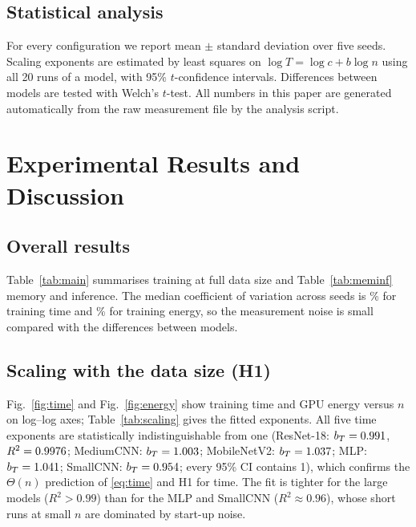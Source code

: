 \documentclass[conference]{IEEEtran}
\begin{document}
\subsection{Statistical analysis}
For every configuration we report mean $\pm$ standard deviation over five seeds. Scaling exponents are estimated by
least squares on $\log T = \log c + b\log n$ using all 20 runs of a model, with 95\% $t$-confidence intervals.
Differences between models are tested with Welch's $t$-test. All numbers in this paper are generated
automatically from the raw measurement file by the analysis script.

\section{Experimental Results and Discussion}
\subsection{Overall results}
Table~\ref{tab:main} summarises training at full data size and Table~\ref{tab:meminf} memory and inference.
The median coefficient of variation across seeds is \cvtime\% for training time and \cvenergy\% for training
energy, so the measurement noise is small compared with the differences between models.

\begin{table}[t]
\centering
\caption{Training at $n=50\,000$ (mean $\pm$ std over 5 seeds). $E^{GPU}$: NVML hardware counter; $E^{tot}$: CodeCarbon CPU+GPU+RAM}
\label{tab:main}

\end{table}

\begin{table}[t]
\centering
\caption{Memory and inference at $n=50\,000$ (mean $\pm$ std). VRAM$_{tr}$: model-attributable peak during training; $T_{inf}$, $E_{inf}$: one pass over the 10k test set on the GPU ($B=1000$)}
\label{tab:meminf}

\end{table}

\subsection{Scaling with the data size (H1)}
Fig.~\ref{fig:time} and Fig.~\ref{fig:energy} show training time and GPU energy versus $n$ on log--log axes;
Table~\ref{tab:scaling} gives the fitted exponents. All five time exponents are statistically indistinguishable from
one (ResNet-18: $b_T=0.991$, $R^2=0.9976$; MediumCNN: $b_T=1.003$; MobileNetV2: $b_T=1.037$; MLP:
$b_T=1.041$; SmallCNN: $b_T=0.954$; every 95\% CI contains 1), which confirms the $\Theta(n)$ prediction of
\eqref{eq:time} and H1 for time. The fit is tighter for the large models ($R^2>0.99$) than for the MLP and SmallCNN
($R^2\approx0.96$), whose short runs at small $n$ are dominated by start-up noise.
\end{document}
